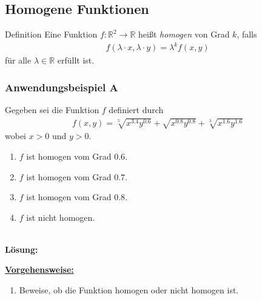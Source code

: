 \newpage
\subsection{Homogene Funktionen}
\begin{mybox}{Definition}
Eine Funktion $f : \mathbb{R}^2 \to \mathbb{R}$ heißt \textit{homogen} von Grad $k$,
falls
\begin{align*}
f(\lambda \cdot x, \lambda \cdot y) = \lambda^k f(x,y)
\end{align*}
für alle $\lambda \in \mathbb{R}$ erfüllt ist.
\end{mybox}

\subsubsection*{Anwendungsbeispiel A}
Gegeben sei die Funktion $f$ definiert durch
\begin{align*}
f(x,y) = \sqrt[5]{x^{3.4}y^{0.6}}+ \sqrt{x^{0.8}y^{0.8}} 
+ \sqrt[3]{x^{1.6}y^{1.6}}
\end{align*}
wobei $x >0$ und $y> 0$.
\renewcommand{\labelenumi}{(\alph{enumi})}
\begin{enumerate}
\item $f$ ist homogen vom Grad $0.6$.
\item $f$ ist homogen vom Grad $0.7$.
\item $f$ ist homogen vom Grad $0.8$.
\item $f$ ist nicht homogen.
	
\end{enumerate}
\ \\
\textbf{Lösung:}
\begin{mdframed}
\underline{\textbf{Vorgehensweise:}}
\renewcommand{\labelenumi}{\theenumi.}
\begin{enumerate}
\item Beweise, ob die Funktion homogen oder nicht homogen ist.
\end{enumerate}
\end{mdframed}

